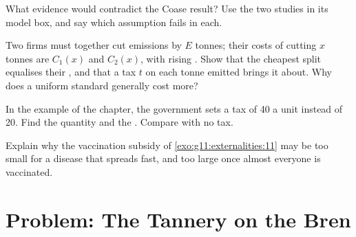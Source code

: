 \begin{exercise}[$\star\star\star$]\label{exo:g11:externalities:12}
What evidence would contradict the Coase result? Use the two studies in its model box, and say which assumption fails in each.
\end{exercise}

\begin{exercise}[$\star\star\star$]\label{exo:g11:externalities:13}
Two firms must together cut emissions by $E$ tonnes; their costs of cutting $x$ tonnes are $C_1(x)$ and $C_2(x)$, with rising . Show that the cheapest
split equalises their , and that a tax $t$ on each tonne emitted brings it about. Why does a uniform standard generally cost more?
\end{exercise}

\begin{exercise}[$\star\star\star$]\label{exo:g11:externalities:14}
In the example of the chapter, the government sets a tax of 40 a unit instead of 20. Find the quantity and the . Compare with no tax.
\end{exercise}

\begin{exercise}[$\star\star\star$]\label{exo:g11:externalities:15}
Explain why the vaccination subsidy of \cref{exo:g11:externalities:11} may be too small for a disease that spreads fast, and too large once almost everyone is
vaccinated.
\end{exercise}

\section{Problem: The Tannery on the Bren}

